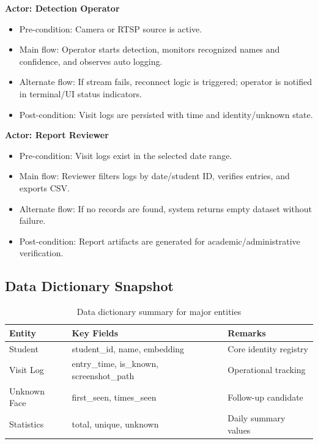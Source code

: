 \documentclass{fisatprojectfinal}
\begin{document}
\textbf{Actor: Detection Operator}
\begin{itemize}
	\item Pre-condition: Camera or RTSP source is active.
	\item Main flow: Operator starts detection, monitors recognized names and confidence, and observes auto logging.
	\item Alternate flow: If stream fails, reconnect logic is triggered; operator is notified in terminal/UI status indicators.
	\item Post-condition: Visit logs are persisted with time and identity/unknown state.
\end{itemize}

\textbf{Actor: Report Reviewer}
\begin{itemize}
	\item Pre-condition: Visit logs exist in the selected date range.
	\item Main flow: Reviewer filters logs by date/student ID, verifies entries, and exports CSV.
	\item Alternate flow: If no records are found, system returns empty dataset without failure.
	\item Post-condition: Report artifacts are generated for academic/administrative verification.
\end{itemize}

\subsection*{Data Dictionary Snapshot}
\begin{table}[h!]
\centering
\caption{Data dictionary summary for major entities}
\begin{tabular}{|l|l|l|}
\hline
Entity & Key Fields & Remarks \\
\hline
Student & student\_id, name, embedding & Core identity registry \\
\hline
Visit Log & entry\_time, is\_known, screenshot\_path & Operational tracking \\
\hline
Unknown Face & first\_seen, times\_seen & Follow-up candidate \\
\hline
Statistics & total, unique, unknown & Daily summary values \\
\hline
\end{tabular}
\end{table}
\end{document}
